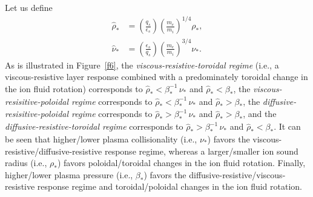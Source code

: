 \documentclass[notitlepage,12pt]{article}
\begin{document}
Let us define 
\begin{align}
\hat{\rho}_\ast&= \left(\frac{q_s}{\epsilon_s}\right)\left(\frac{m_e}{m_i}\right)^{1/4}\rho_\ast,\\[0.5ex]
\hat{\nu}_\ast&=\left(\frac{\epsilon_s}{q_s}\right)\left(\frac{m_e}{m_i}\right)^{3/4}\nu_\ast.
\end{align}
As is illustrated in Figure~\ref{f6}, the {\em viscous-resistive-toroidal regime}\/ (i.e., a viscous-resistive layer response
combined with a predominately toroidal change in the ion fluid rotation) corresponds to $\hat{\rho}_\ast < \beta_\ast^{-1}\,\nu_\ast$ 
and $\hat{\rho}_\ast <\beta_\ast$, the {\em viscous-resisitive-poloidal regime}\/ corresponds to 
 $\hat{\rho}_\ast<\beta_\ast^{-1}\,\nu_\ast$ and $\hat{\rho}_\ast > \beta_\ast$, the {\em diffusive-resisitive-poloidal regime}\/ corresponds to  
 $\hat{\rho}_\ast>\beta_\ast^{-1}\,\nu_\ast$ and $\hat{\rho}_\ast > \beta_\ast$, and the {\em diffusive-resistive-toroidal regime}\/ corresponds to   
 $\hat{\rho}_\ast>\beta_\ast^{-1}\,\nu_\ast$ and $\hat{\rho}_\ast < \beta_\ast$.
It can be seen that higher/lower plasma collisionality (i.e., $\nu_\ast$) favors the viscous-resistive/diffusive-resistive response regime, whereas a
larger/smaller ion sound radius (i.e., $\rho_\ast$) favors poloidal/toroidal changes in the ion fluid rotation. Finally, higher/lower plasma
pressure (i.e., $\beta_\ast$) 
favors the diffusive-resistive/viscous-resistive response regime and toroidal/poloidal changes in the ion fluid rotation. 
\end{document}
